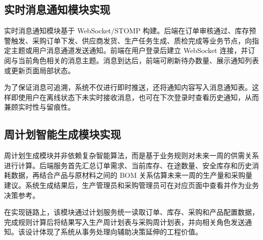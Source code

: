 \subsection{实时消息通知模块实现}

实时消息通知模块基于 WebSocket/STOMP 构建。后端在订单审核通过、库存预警触发、采购订单下发、供应商发货、生产任务生成、质检完成等业务节点，向指定主题或用户消息通道发送通知。前端在用户登录后建立 WebSocket 连接，并订阅与当前角色相关的消息主题。消息到达后，前端可刷新待办数量、展示通知列表或更新页面局部状态。

为了保证消息可追溯，系统不仅进行即时推送，还将通知内容写入消息通知表。这样即使用户在离线状态下未实时接收消息，也可在下次登录时查看历史通知，从而兼顾实时性与留痕性。

\subsection{周计划智能生成模块实现}

周计划生成模块并非依赖复杂智能算法，而是基于业务规则对未来一周的供需关系进行计算。后端服务首先汇总订单需求、当前库存、在途数量、安全库存和历史消耗数据，再结合产品与原材料之间的 BOM 关系估算未来一周的生产量和采购量建议。系统生成结果后，生产管理员和采购管理员可在对应页面中查看并作为业务决策参考。

在实现链路上，该模块通过计划服务统一读取订单、库存、采购和产品配置数据，完成规则计算后将结果写入生产周计划表与采购周计划表，并向相关角色发送通知。该设计体现了系统从事务处理向辅助决策延伸的工程价值。